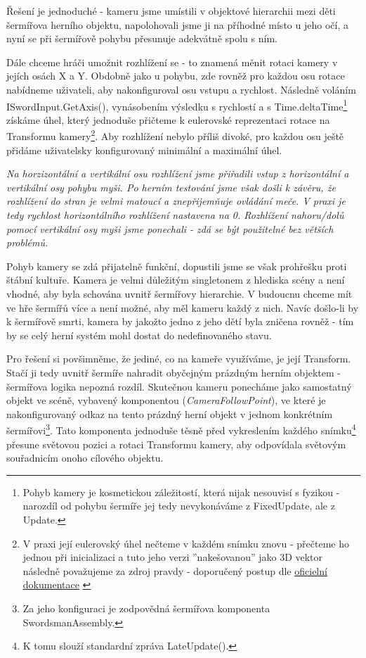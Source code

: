 Řešení je jednoduché - kameru jsme umístili v objektové hierarchii mezi děti šermířova herního objektu, napolohovali jsme ji na příhodné místo u jeho očí, a nyní se při šermířově pohybu přesunuje adekvátně spolu s ním. 

Dále chceme hráči umožnit rozhlížení se - to znamená měnit rotaci kamery v jejích osách X a Y. Obdobně jako u pohybu, zde rovněž pro každou osu rotace nabídneme uživateli, aby nakonfiguroval osu vstupu a rychlost. Následně voláním ISwordInput.GetAxis(), vynásobením výsledku s rychlostí a s Time.deltaTime\footnote{Pohyb kamery je kosmetickou záležitostí, která nijak nesouvisí s fyzikou - narozdíl od pohybu šermíře jej tedy nevykonáváme z FixedUpdate, ale z Update.} získáme úhel, který jednoduše přičteme k eulerovské reprezentaci rotace na Transformu kamery\footnote{V praxi její eulerovský úhel nečteme v každém snímku znovu - přečteme ho jednou při inicializaci a tuto jeho verzi ''nakešovanou'' jako 3D vektor následně považujeme za zdroj pravdy - doporučený postup dle \href{https://docs.unity3d.com/2022.2/Documentation/ScriptReference/Quaternion-eulerAngles.html}{\underline{oficielní dokumentace}} \cite{Unity}}. Aby rozhlížení nebylo příliš divoké, pro každou osu ještě přidáme uživatelsky konfigurovaný minimální a maximální úhel.

\textit{Na horzizontální a vertikální osu rozhlížení jsme přiřadili vstup z horizontální a vertikální osy pohybu myši. Po herním testování jsme však došli k závěru, že rozhlížení do stran je velmi matoucí a znepřijemňuje ovládání meče. V praxi je tedy rychlost horizontálního rozhlížení nastavena na 0. Rozhlížení nahoru/dolů pomocí vertikální osy myši jsme ponechali - zdá se být použitelné bez větších problémů.}

Pohyb kamery se zdá přijatelně funkční, dopustili jsme se však prohřešku proti štábní kultuře. Kamera je velmi důležitým singletonem z hlediska scény a není vhodné, aby byla schována uvnitř šermířovy hierarchie. V budoucnu chceme mít ve hře šermířů více a není možné, aby měl kameru každý z nich. Navíc došlo-li by k šermířově smrti, kamera by jakožto jedno z jeho dětí byla zničena rovněž - tím by se celý herní systém mohl dostat do nedefinovaného stavu.

Pro řešení si povšimněme, že jediné, co na kameře využíváme, je její Transform. Stačí ji tedy uvnitř šermíře nahradit obyčejným prázdným herním objektem - šermířova logika nepozná rozdíl. Skutečnou kameru ponecháme jako samostatný objekt ve scéně, vybavený komponentou (\textit{CameraFollowPoint}), ve které je nakonfigurovaný odkaz na tento prázdný herní objekt v jednom konkrétním šermířovi\footnote{Za jeho konfiguraci je zodpovědná šermířova komponenta SwordsmanAssembly.}. Tato komponenta jednoduše těsně před vykreslením každého snímku\footnote{K tomu slouží standardní zpráva LateUpdate().} přesune světovou pozici a rotaci Transformu kamery, aby odpovídala světovým souřadnicím onoho cílového objektu. 


